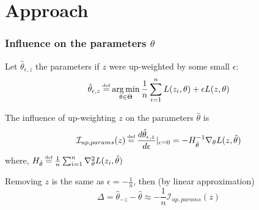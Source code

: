 \documentclass[UTF8]{beamer}
\newcommand\myeq{\stackrel{\mathclap{\tiny\mbox{def}}}{=}}
\DeclareMathOperator*{\argmin}{arg\,min}
\begin{document}
\section{Approach}
\frame{\tableofcontents[currentsection, sectionstyle=show/shaded]}
\begin{frame}
\frametitle{Influence on the parameters $\theta$}
Let $\hat{\theta}_{\epsilon, z}$ the parameters if $z$ were up-weighted by some small $\epsilon$:
\begin{equation} \nonumber
\hat{\theta}_{\epsilon, z} \myeq \argmin_{\theta\in\Theta}\frac{1}{n}\sum_{i=1}^nL(z_i, \theta) + \epsilon L(z, \theta)
\end{equation}

The influence of up-weighting $z$ on the parameters $\hat\theta$ is
\begin{equation}
\mathcal{I}_{up,params}(z)\myeq\frac{d\hat{\theta}_{\epsilon, z}}{d\epsilon}\vert_{\epsilon=0} = -H^{-1}_{\hat{\theta}}\nabla_\theta{}L(z, \hat{\theta}) 
\end{equation}
where, $H_{\hat\theta} \myeq \frac{1}{n}\sum_{i=1}^n\nabla^2_{\theta}L(z_i, \hat\theta)$

Removing $z$ is the same as $\epsilon = -\frac{1}{n}$, then (by linear approximation)
\begin{equation}
\Delta = \hat{\theta}_{-z} - \hat{\theta} \approx -\frac{1}{n}\mathcal{I}_{up,params}(z) \nonumber
\end{equation}
\end{frame}
\end{document}
